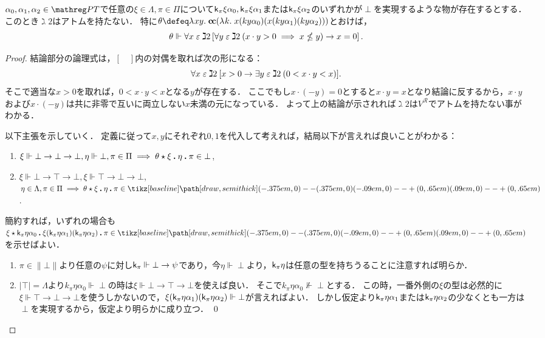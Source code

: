 \documentclass[realisability.tex]{subfiles}
\begin{document}
\begin{lemma}
 $\alpha_0, \alpha_1, \alpha_2 \in \PT$で任意の$\xi \in \Lambda, \pi \in \Pi$について$\mathsf{k}_\pi \xi \alpha_0, \mathsf{k}_\pi \xi \alpha_1$または$\mathsf{k}_\pi \xi \alpha_2$のいずれかが$\perp$を実現するような物が存在するとする．
 このとき$\gimel2$はアトムを持たない．
 特に$\theta \defeq \abs{xy}{\cc (\abs{k}{x (k y \alpha_0)(x (k y \alpha_1)(k y \alpha_2))})}$とおけば，
 \[
  \theta \Vdash \forall x \mathrel{\varepsilon} \gimel 2 \left[ \forall y \mathrel{\varepsilon} \gimel 2 \: (x \cdot y > 0 \implies x \nleq y) \to x = 0 \right].
 \]
\end{lemma}
\begin{proof}
 結論部分の論理式は，$[\quad]$内の対偶を取れば次の形になる：
 \[
  \forall x \mathrel{\varepsilon} \gimel 2 \: [ x > 0 \to \exists y \mathrel{\varepsilon} \gimel 2 \: (0 < x \cdot y < x)].
 \]
 そこで適当な$x > 0$を取れば，$0 < x \cdot y < x$となる$y$が存在する．
 ここでもし$x \cdot (- y) = 0$とすると$x \cdot y = x$となり結論に反するから，$x \cdot y$および$x \cdot (- y)$は共に非零で互いに両立しない$x$未満の元になっている．
 よって上の結論が示されれば$\gimel 2$は$V^{\mathcal{R}}$でアトムを持たない事がわかる．

 以下主張を示していく．
 定義に従って$x, y$にそれぞれ$0, 1$を代入して考えれば，結局以下が言えれば良いことがわかる：
 \begin{enumerate}
  \item $\xi \Vdash \bot \to \bot \to \bot, \eta \Vdash \bot, \pi \in \Pi \implies \KVM{\theta \xi \eta \pi} \in \bot$,
  \item $\xi \Vdash \bot \to \top \to \bot, \xi \Vdash \top \to \bot \to \bot$, $\eta \in \Lambda, \pi \in \Pi \implies \KVM{\theta \xi \eta \pi} \in \pole$.
 \end{enumerate}
 簡約すれば，いずれの場合も$\KVM{\xi {{\conti_\pi \eta \alpha_0}}{\xi (\conti_\pi \eta \alpha_1)(\conti_\pi \eta \alpha_2)} \pi} \in \pole$を示せばよい．
 \begin{enumerate}
  \item $\pi \in \|\bot\|$より任意の$\psi$に対し$\mathsf{k}_\pi \Vdash \bot \to \psi$であり，今$\eta \Vdash \perp$より，$\mathsf{k}_\pi \eta$は任意の型を持ちうることに注意すれば明らか．
  \item $|\top| = \Lambda$より$k_\pi \eta \alpha_0 \Vdash \perp$の時は$\xi \Vdash \bot \to \top \to \bot$を使えば良い．
        そこで$k_\pi \eta \alpha_0 \nVdash \perp$とする．
        この時，一番外側の$\xi$の型は必然的に$\xi \Vdash \top \to \bot \to \bot$を使うしかないので，$\xi (\mathsf{k}_\pi \eta \alpha_1) (\mathsf{k}_\pi \eta \alpha_2) \Vdash \bot$が言えればよい．
        しかし仮定より$\mathsf{k}_\pi \eta \alpha_1$または$\mathsf{k}_\pi \eta \alpha_2$の少なくとも一方は$\perp$を実現するから，仮定より明らかに成り立つ． \qed
 \end{enumerate}
\end{proof}
\end{document}
